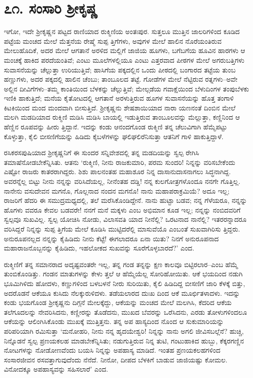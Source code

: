 
\chapter{೭೧. ಸಂಸಾರಿ ಶ್ರೀಕೃಷ್ಣ}

ಇಗೋ, ಇದೇ ಶ್ರೀಕೃಷ್ಣನ ಪಟ್ಟದ ರಾಣಿಯಾದ ರುಕ್ಮಿಣಿಯ ಅಂತಃಪುರ. ಸುತ್ತಲೂ ಮುತ್ತಿನ ಜಾಲರಿಗಳಿಂದ ಕೂಡಿದ ಪಟ್ಟೆಯ ಮಂಚದ ಮೇಲೆ ಮೆತ್ತನೆಯ ರೇಷ್ಮೆ ಸುಪ್ಪ ತ್ತಿಗೆಗಳು, ಅವುಗಳ ಮೇಲೆ ಹಾಲಿನ ನೊರೆಯಂತಿರುವ ಮೇಲುಹೊದಿಕೆ, ಅದರ ಮೇಲೆ ಆಗತಾನೆ ಅರಳಿದ ಮಲ್ಲಿಗೆ ಜಾಜಿಯ ಹೂಗಳು, ಬಗೆಬಗೆಯ ಹೂವಿನ ಹಾರಗಳು ಆ ಮಂಚಕ್ಕೆ ಹಾಕಿದ ಪರದೆಯಂತಿವೆ; ಎಂಟು ಮೂಲೆಗಳಲ್ಲಿಯೂ ಎಂಟು ಎತ್ತರವಾದ ಪೀಠಗಳ ಮೇಲೆ ಅಗರುಬತ್ತಿಗಳು ಸುವಾಸನೆಯನ್ನು ಚೆಲ್ಲುತ್ತಾ ಉರಿಯುತ್ತಿವೆ; ಹಾಸಿಗೆಯ ಪಕ್ಕದಲ್ಲಿನ ಒಂದು ಪೀಠದಲ್ಲಿ ಬಂಗಾರದ ತಟ್ಟೆಯ ತುಂಬ ಹಣ್ಣುಗಳು, ಅದರ ಪಕ್ಕದಲ್ಲಿ ಹಾಲಿನ ಚೆಂಬು; ತಾಂಬೂಲದ ತಟ್ಟೆ. ಗೋಡೆಗಳ ಮೇಲೆ ನೆಟ್ಟಿರುವ ರತ್ನಗಳು–ಅವೇ ಅಲ್ಲಿನ ದೀವಿಗೆಗಳು–ತಮ್ಮ ಕಾಂತಿಯಿಂದ ಬೆಳಕನ್ನು ಚೆಲ್ಲುತ್ತಿವೆ; ಮೇಲ್ಗಡೆಯ ಗವಾಕ್ಷೆಯಿಂದ ಬೆಳುದಿಂಗಳ ತಂಪುಬೆಳಕು ಇಣಿಕಿ ಹಾಕುತ್ತಿದೆ; ಮನೆಯ ಕೈತೋಟದಲ್ಲಿ ಆಗತಾನೆ ಅರಳುತ್ತಿರುವ ಹೂಗಳ ಸುವಾಸನೆಯನ್ನು ಹೊತ್ತ ತಂಗಾಳಿ ಕಿಟಕಿಯಿಂದ ಮಂದ ಮಂದವಾಗಿ ಬೀಸುತ್ತಿದೆ. ಶ್ರೀಕೃಷ್ಣನು ಶೇಷಶಾಯಿಯಾದ ನಾರಾ ಯಣನಂತೆ ದಿಂಬಿನ ಮೇಲೆ ಮಲಗಿ ಮಡದಿಯಾದ ರುಕ್ಮಿಣಿ ಮಡಿಸಿ ಮಡಿಸಿ ಬಾಯಲ್ಲಿ ಇಡುತ್ತಿರುವ ತಾಂಬೂಲವನ್ನು ಮೆಲ್ಲುತ್ತಾ, ಕಣ್ಣಿನಿಂದ ಆ ಹೆಣ್ಣಿನ ರೂಪವನ್ನು ಹೀರು ತ್ತಿದ್ದಾನೆ. ಇದನ್ನು ಕಂಡು ಆನಂದಗೊಂಡ ರುಕ್ಮಿಣಿ ತನ್ನ ಚೆಲುವಿಗಾಗಿ ಹೆಮ್ಮೆಪಟ್ಟು ಕೊಳ್ಳುತ್ತಾ, ಕೈಲಿ ಬೀಸಣಿಗೆಯನ್ನು ಹಿಡಿದು ಕೈಬಳೆಗಳನ್ನು ಘಲಿಘಲಿರೆನಿಸುತ್ತಾ ಆತನಿಗೆ ಗಾಳಿ ಹಾಕುತ್ತಿದ್ದಾಳೆ.

ರಸಿಕರಸಪುಷಿಯಾದ ಶ್ರೀಕೃಷ್ಣನಿಗೆ ಈ ಸುಂದರ ಸನ್ನಿವೇಶದಲ್ಲಿ ತನ್ನ ಮಡದಿಯನ್ನು ಸ್ವಲ್ಪ ರೇಗಿಸಿ ತಮಾಷೆನೋಡಬೇಕೆನ್ನಿಸಿತು. ಆತನು ‘ರುಕ್ಮಿಣಿ, ನೀನು ರಾಜಕುಮಾರಿ, ಪರಮ ಸುಂದರಿ! ನಿನ್ನನ್ನು ವರಿಸಬೇಕೆಂದು ಎಷ್ಟೋ ರಾಜರು ಕಾತರರಾಗಿದ್ದರು. ಶಿಶು ಪಾಲನಂತಹ ಮಹಾಶೂರ ನಿನ್ನ ದಾಸಾನುದಾಸನಾಗಲು ಸಿದ್ಧನಾಗಿದ್ದ. ಅವರನ್ನೆಲ್ಲ ಬಿಟ್ಟು ನೀನು ನನ್ನನ್ನು ವರಿಸಿದೆಯಲ್ಲ, ನೀನೆಂತಹ ದಡ್ಡಿ! ನನ್ನ ಕುಲಗೋತ್ರಗಳೊಂದೂ ನನಗೇ ಗೊತ್ತಿಲ್ಲ. ನಾನೇನು ವಸುದೇವನ ಮಗನೊ, ಗೊಲ್ಲನಾದ ನಂದನ ಮಗನೊ! ನಾನು ಮಹಾಪರಾಕ್ರಮಿಯೆ? ಅದೂ ಇಲ್ಲ; ರಾಜರಿಗೆ ಹೆದರಿ ಈ ಸಮುದ್ರಮಧ್ಯದಲ್ಲಿ, ತಲೆ ಮರೆಸಿಕೊಂಡಿದ್ದೇನೆ. ನಾನು ಹುಟ್ಟಾ ಬಡವ; ನನ್ನ ಗೆಳೆಯರೂ, ನನ್ನನ್ನು ಹೊಗಳು ವವರೂ ಕೇವಲ ಬಡವರೇ! ನನಗೆ ಮನೆ ಮಕ್ಕಳು ಎಂಬ ಅಭಿಮಾನ ಕೂಡ ಇಲ್ಲ; ನನ್ನನ್ನು ನಂಬಿದವರಿಗೆ ಸ್ವಲ್ಪವೂ ಸುಖವಿಲ್ಲ. ಸ್ವಲ್ಪ ಯೋಚಿಸಿ ನೋಡು, ವಿಲಾಸವತಿ ಯಾದ ನೀನೆಲ್ಲಿ? ಒರಟನಾದ ನಾನೆಲ್ಲಿ? ಇತರರನ್ನಾದರೂ ವರಿಸಿದ್ದರೆ ನಿನ್ನನ್ನು ಸುಪ್ಪ ತ್ತಿಗೆಯ ಮೇಲೆ ಕೂಡಿಸಿ ಮುಟ್ಟಿದರೆಲ್ಲಿ ಮಾಸುವೆಯೊ ಎಂಬಂತೆ ಸುಖವಾಗಿರಿಸು ತ್ತಿದ್ದರು. ಅನುರೂಪನಲ್ಲದ ನನ್ನನ್ನು ಕೈಹಿಡಿದು ನೀನು ಕೆಟ್ಟೆ! ಈಗಲಾದರೂ ಏನಾ ಯಿತು? ನಿನಗೆ ಅನುರೂಪನಾದ ಮಹಾರಾಜನೊಬ್ಬನನ್ನು ಕೈಹಿಡಿದು, ಇಹಲೋಕದ ಸುಖವನ್ನು ಸೂರೆಗೊಳ್ಳಬಾರದೆ?’ ಎಂದ. 

ರುಕ್ಮಿಣಿಗೆ ತನ್ನ ಸಮಾನರಾದ ಅದೃಷ್ಟವಂತರೇ ಇಲ್ಲ, ತನ್ನ ಗಂಡ ತನ್ನನ್ನು ಕ್ಷಣ ಕಾಲವೂ ಬಿಟ್ಟಿರಲಾರ–ಎಂಬ ಹೆಮ್ಮೆ ತುಂಬಿಕೊಂಡಿತ್ತು. ಗಂಡನ ಮಾತುಗಳನ್ನು ಕೇಳು ತ್ತಲೆ ಆ ಹೆಮ್ಮೆಯೆಲ್ಲ ಸೋರಿಹೋಯಿತು. ಆಕೆ ಭಯದಿಂದ ನಡುಗಿ ಭೂಮಿಗಿಳಿದು ಹೋದಳು, ಕಣ್ಣುಗಳಿಂದ ಬಳಬಳನೆ ನೀರು ಸುರಿಯಿತು, ಕೈಲಿ ಹಿಡಿದಿದ್ದ ಬೀಸಣಿಗೆ ಜಾರಿ ಕೆಳಕ್ಕೆ ಬಿತ್ತು, ಅದರೊಡನೆ ಆಕೆಯೂ ಕುಸಿದು ನೆಲಕ್ಕುರುಳಿದಳು. ತಡೆಯಲಾರದ ದುಃಖ ದಿಂದ ಆಕೆ ಮೂರ್ಛಿತಳಾದಳು. ಇದನ್ನು ಕಂಡು ಭಯಗೊಂಡ ಶ್ರೀಕೃಷ್ಣನು ದಿಗ್ಗನೆ ಮೇಲಕ್ಕೆದ್ದು, ಆಕೆಯನ್ನು ಮಂಚದ ಮೇಲೆ ಮಲಗಿಸಿ, ಕೆದರಿದ ಆಕೆಯ ತಲೆಗೂದಲನ್ನು ನೇವರಿಸಿದನು, ಕಣ್ಣೀರನ್ನು ತೊಡೆದನು, ಮುಖದ ಬೆವರನ್ನು ಒರೆಸಿದನು, ಎರಡು ತೋಳುಗಳಿಂದಲೂ ಆಕೆಯನ್ನು ಆಲಿಂಗಿಸಿಕೊಂಡು ಮುಖಕ್ಕೆ ಮುತ್ತಿತ್ತನು. ತನ್ನ ಅಪ ಹಾಸ್ಯದಿಂದ ನೊಂದ ಆ ಸುಕುಮಾರಿಯನ್ನು ಪರಿಪರಿಯಾಗಿ ರಮಿಸುತ್ತಾ ‘ಮನೋಹರಿ, ನೀನು ನನ್ನ ಹೃದಯೇಶ್ವರಿ! ನಿನ್ನನ್ನು ನಾನು ಅಗಲಿ ಜೀವಿಸಬಲ್ಲೆನೆ? ಹುಚ್ಚಿ, ನಿನ್ನೊಡನೆ ಸ್ವಲ್ಪ ಪ್ರಣಯಕಲಹ ಮಾಡಬೇಕೆನ್ನಿಸಿತು; ನಡುಗುತ್ತಿರುವ ನಿನ್ನ ತುಟಿ, ಗಂಟುಹಾಕಿದ ಹುಬ್ಬು, ಕೆಕ್ಕರಗಣ್ಣಿನ ನೋಟಗಳನ್ನು ನೋಡೋಣವೆಂದು ಬಯಸಿ ನಿನ್ನನ್ನು ಅಪಹಾಸ್ಯ ಮಾಡಿದೆ. ಇಂತಹ ಪ್ರಣಯಕಲಹಗಳಿಂದ ಸಂಸಾರಜೀವನ ರಸವತ್ತಾಗುವುದೆಂದು ನೆನೆದೆ. ನೀನೋ, ದೀಪದ ಬೆಳಕಿಗೆ ಬಾಡುವ ಜಾಜಿಯಷ್ಟು ಕೋಮಲ. ವಿನೋದಕ್ಕೂ ಅಪಹಾಸ್ಯವನ್ನು ಸಹಿಸಲಾರೆ’ ಎಂದ.

